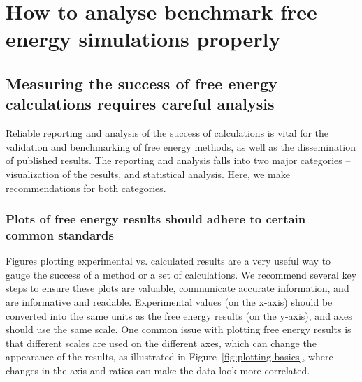 \documentclass[9pt,bestpractices]{livecoms}
\begin{document}
\section{How to analyse benchmark free energy simulations properly}
\label{sec:analysis}

\subsection{Measuring the success of free energy calculations requires careful analysis}

Reliable reporting and analysis of the success of calculations is vital for the validation and benchmarking of free energy methods, as well as the dissemination of published results. The reporting and analysis falls into two major categories -- visualization of the results, and statistical analysis. Here, we make recommendations for both categories.

\subsubsection{Plots of free energy results should adhere to certain common standards}
\label{sec:plotting_results}
Figures plotting experimental vs. calculated results are a very useful way to gauge the success of a method or a set of calculations. We recommend several key steps to ensure these plots are valuable, communicate accurate information, and are informative and readable. Experimental values (on the x-axis) should be converted into the same units as the free energy results (on the y-axis), and axes should use the same scale. One common issue with plotting free energy results is that different scales are used on the different axes, which can change the appearance of the results, as illustrated in Figure~\ref{fig:plotting-basics}, where changes in the axis and ratios can make the data look more correlated.
\end{document}
